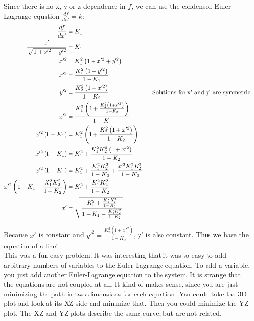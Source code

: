 \documentclass[10pt]{article} %
\begin{document}
Since there is no x, y or z dependence in $f$, we can use the condensed Euler-Lagrange equation $\frac{df}{dn'} = k$:\\

\begin{align*}
  \frac{df}{dx'} &= K_1\\
  \frac{x'}{\sqrt{1 + x'^2 + y'^2}} &= K_1\\
  x'^2 &= K_1^2\left(1 + x'^2 + y'^2\right)\\
  x'^2 &= \frac{K_1^2\left(1 + y'^2\right)}{1-K_1}\\
  y'^2 &= \frac{K_2^2\left(1 + x'^2\right)}{1-K_2}
  \hspace*{1in} \mbox{Solutions for x' and y' are symmetric}\\
  x'^2 &= \frac{K_1^2\left(1 + \frac{K_2^2\left(1 + x'^2\right)}{1-K_2}\right)}{1-K_1}\\
  x'^2\left(1-K_1\right) &= K_1^2\left(1 + \frac{K_2^2\left(1 + x'^2\right)}{1-K_2}\right)\\
  x'^2\left(1-K_1\right) &= K_1^2 + \frac{K_1^2K_2^2\left(1 + x'^2\right)}{1-K_2}\\
  x'^2\left(1-K_1\right) &= K_1^2 + \frac{K_1^2K_2^2}{1-K_2} + \frac{x'^2K_1^2K_2^2}{1-K_2}\\
  x'^2\left(1-K_1 - \frac{K_1^2K_2^2}{1-K_2}\right) &= K_1^2 + \frac{K_1^2K_2^2}{1-K_2}\\
  x' &= \sqrt{\frac{K_1^2 + \frac{K_1^2K_2^2}{1-K_2}}{1-K_1 - \frac{K_1^2K_2^2}{1-K_2}}}\\
\end{align*}

Because $x'$ is constant and $y'^2 = \frac{K_2^2\left(1 + x'^2\right)}{1-K_2}$, y' is also constant. Thus we have the equation of a line!\\

This was a fun easy problem. It was interesting that it was so easy to add arbitrary numbers of variables to the Euler-Lagrange equation. To add a variable, you just add another Euler-Lagrange equation to the system. It is strange that the equations are not coupled at all. It kind of makes sense, since you are just minimizing the path in two dimensions for each equation. You could take the 3D plot and look at its XZ side and minimize that. Then you could minimize the YZ plot. The XZ and YZ plots describe the same curve, but are not related.
\end{document}
